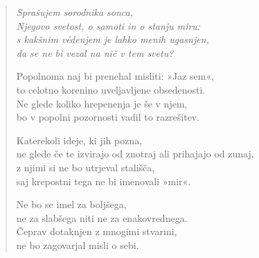 \begin{verse}


\emph{Sprašujem sorodnika sonca,}\\
\emph{Njegovo svetost, o samoti in o stanju miru:}\\
\emph{s kakšnim védenjem je lahko menih ugasnjen,}\\
\emph{da se ne bi vezal na nič v tem svetu?}

Popolnoma naj bi prenehal misliti: »Jaz sem«,\\
to celotno korenino uveljavljene obsedenosti.\\
Ne glede koliko hrepenenja je še v njem,\\
bo v popolni pozornosti vadil to razrešitev.

Katerekoli ideje, ki jih pozna,\\
ne glede če te izvirajo od znotraj ali prihajajo od zunaj,\\
z njimi si ne bo utrjeval stališča,\\
saj krepostni tega ne bi imenovali »mir«.

Ne bo se imel za boljšega,\\
ne za slabšega niti ne za enakovrednega.\\
Čeprav dotaknjen z mnogimi stvarmi,\\
ne bo zagovarjal misli o sebi.

\end{verse}



